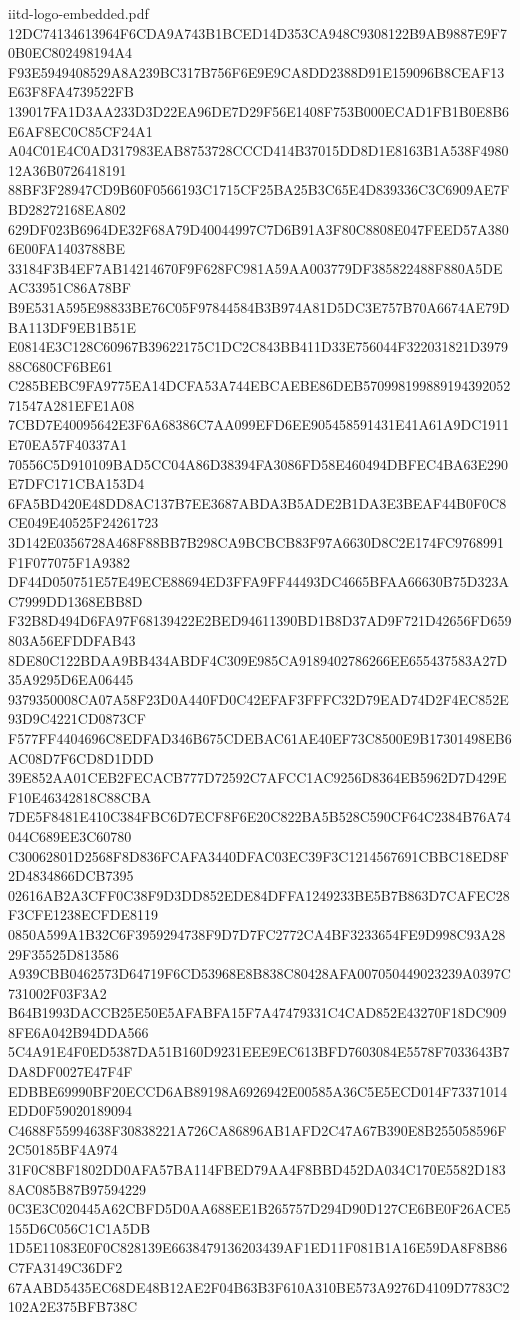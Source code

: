 \begin{filecontents*}[overwrite]{iitd-logo-embedded.pdf}
12DC74134613964F6CDA9A743B1BCED14D353CA948C9308122B9AB9887E9F70B0EC802498194A4
F93E5949408529A8A239BC317B756F6E9E9CA8DD2388D91E159096B8CEAF13E63F8FA4739522FB
139017FA1D3AA233D3D22EA96DE7D29F56E1408F753B000ECAD1FB1B0E8B6E6AF8EC0C85CF24A1
A04C01E4C0AD317983EAB8753728CCCD414B37015DD8D1E8163B1A538F498012A36B0726418191
88BF3F28947CD9B60F0566193C1715CF25BA25B3C65E4D839336C3C6909AE7FBD28272168EA802
629DF023B6964DE32F68A79D40044997C7D6B91A3F80C8808E047FEED57A3806E00FA1403788BE
33184F3B4EF7AB14214670F9F628FC981A59AA003779DF385822488F880A5DEAC33951C86A78BF
B9E531A595E98833BE76C05F97844584B3B974A81D5DC3E757B70A6674AE79DBA113DF9EB1B51E
E0814E3C128C60967B39622175C1DC2C843BB411D33E756044F322031821D397988C680CF6BE61
C285BEBC9FA9775EA14DCFA53A744EBCAEBE86DEB57099819988919439205271547A281EFE1A08
7CBD7E40095642E3F6A68386C7AA099EFD6EE905458591431E41A61A9DC1911E70EA57F40337A1
70556C5D910109BAD5CC04A86D38394FA3086FD58E460494DBFEC4BA63E290E7DFC171CBA153D4
6FA5BD420E48DD8AC137B7EE3687ABDA3B5ADE2B1DA3E3BEAF44B0F0C8CE049E40525F24261723
3D142E0356728A468F88BB7B298CA9BCBCB83F97A6630D8C2E174FC9768991F1F077075F1A9382
DF44D050751E57E49ECE88694ED3FFA9FF44493DC4665BFAA66630B75D323AC7999DD1368EBB8D
F32B8D494D6FA97F68139422E2BED94611390BD1B8D37AD9F721D42656FD659803A56EFDDFAB43
8DE80C122BDAA9BB434ABDF4C309E985CA9189402786266EE655437583A27D35A9295D6EA06445
9379350008CA07A58F23D0A440FD0C42EFAF3FFFC32D79EAD74D2F4EC852E93D9C4221CD0873CF
F577FF4404696C8EDFAD346B675CDEBAC61AE40EF73C8500E9B17301498EB6AC08D7F6CD8D1DDD
39E852AA01CEB2FECACB777D72592C7AFCC1AC9256D8364EB5962D7D429EF10E46342818C88CBA
7DE5F8481E410C384FBC6D7ECF8F6E20C822BA5B528C590CF64C2384B76A74044C689EE3C60780
C30062801D2568F8D836FCAFA3440DFAC03EC39F3C1214567691CBBC18ED8F2D4834866DCB7395
02616AB2A3CFF0C38F9D3DD852EDE84DFFA1249233BE5B7B863D7CAFEC28F3CFE1238ECFDE8119
0850A599A1B32C6F3959294738F9D7D7FC2772CA4BF3233654FE9D998C93A2829F35525D813586
A939CBB0462573D64719F6CD53968E8B838C80428AFA007050449023239A0397C731002F03F3A2
B64B1993DACCB25E50E5AFABFA15F7A47479331C4CAD852E43270F18DC9098FE6A042B94DDA566
5C4A91E4F0ED5387DA51B160D9231EEE9EC613BFD7603084E5578F7033643B7DA8DF0027E47F4F
EDBBE69990BF20ECCD6AB89198A6926942E00585A36C5E5ECD014F73371014EDD0F59020189094
C4688F55994638F30838221A726CA86896AB1AFD2C47A67B390E8B255058596F2C50185BF4A974
31F0C8BF1802DD0AFA57BA114FBED79AA4F8BBD452DA034C170E5582D1838AC085B87B97594229
0C3E3C020445A62CBFD5D0AA688EE1B265757D294D90D127CE6BE0F26ACE5155D6C056C1C1A5DB
1D5E11083E0F0C828139E6638479136203439AF1ED11F081B1A16E59DA8F8B86C7FA3149C36DF2
67AABD5435EC68DE48B12AE2F04B63B3F610A310BE573A9276D4109D7783C2102A2E375BFB738C

\end{filecontents*}
